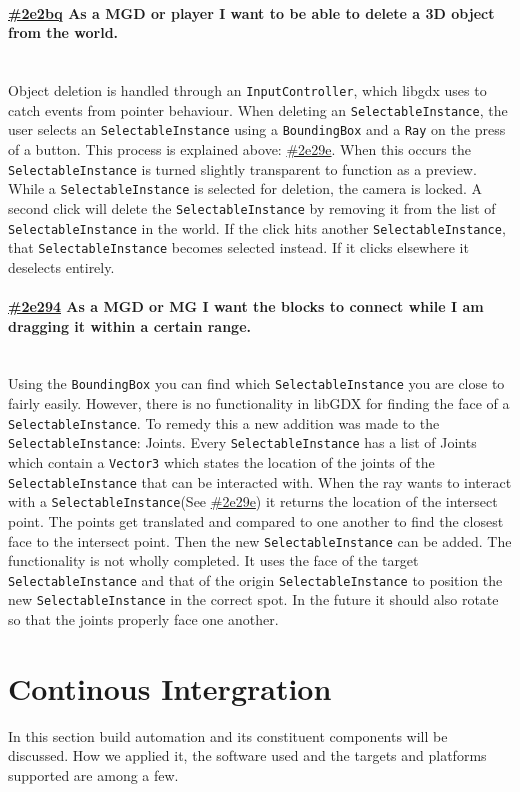 \documentclass[10pt]{extarticle} %
\newcommand{\myparagraph}[1]{\paragraph{#1}\mbox{}\\} %
\def\code#1{\texttt{#1}}
\begin{document}
    \myparagraph{\href{\clickup{2e2bq}}{\#2e2bq} As a MGD or player I want to be able to delete a 3D object from the world.}
Object deletion is handled through an \code{InputController}, which libgdx uses to catch events from pointer behaviour.
When deleting an \code{SelectableInstance}, the user selects an \code{SelectableInstance} using a \code{BoundingBox} and a \code{Ray} on the press of a button. This process is explained above: \href{\clickup{2e29e}}{\#2e29e}.
When this occurs the \code{SelectableInstance} is turned slightly transparent to function as a preview.
While a \code{SelectableInstance} is selected for deletion, the camera is locked.
A second click will delete the \code{SelectableInstance} by removing it from the list of \code{SelectableInstance} in the world.
If the click hits another \code{SelectableInstance}, that \code{SelectableInstance} becomes selected instead.
    If it clicks elsewhere it deselects entirely.

    \myparagraph{\href{\clickup{2e294}}{\#2e294} As a MGD or MG I want the blocks to connect while I am dragging it within a certain range.}
Using the \code{BoundingBox} you can find which \code{SelectableInstance} you are close to fairly easily.
However, there is no functionality in libGDX for finding the face of a \code{SelectableInstance}.
To remedy this a new addition was made to the \code{SelectableInstance}: Joints.
Every \code{SelectableInstance} has a list of Joints which contain a \code{Vector3} which states the location of the joints of the \code{SelectableInstance} that can be interacted with.
When the ray wants to interact with a \code{SelectableInstance}(See \href{\clickup{2e29e}}{\#2e29e}) it returns the location of the intersect point.
    The points get translated and compared to one another to find the closest face to the intersect point.
Then the new \code{SelectableInstance} can be added.
    The functionality is not wholly completed.
It uses the face of the target \code{SelectableInstance} and that of the origin \code{SelectableInstance} to position the new \code{SelectableInstance} in the correct spot.
    In the future it should also rotate so that the joints properly face one another.



    \newpage
    \section{Continous Intergration}
    In this section build automation and its constituent components will be discussed.
    How we applied it, the software used and the targets and platforms supported are among a few.
    \newpage
\end{document}
